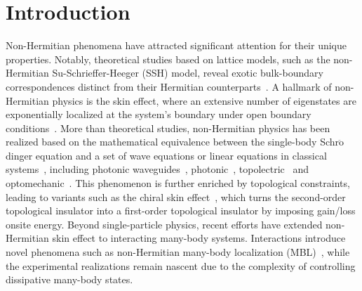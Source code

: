 \documentclass[longbibliography, aps, prx, amsmath, amssymb, amsfonts, twocolumn,superscriptaddress, footinbib]{revtex4-1}
\begin{document}
	\section{Introduction}
	Non-Hermitian phenomena have attracted significant attention for their unique properties. Notably, theoretical studies based on lattice models, such as the non-Hermitian Su-Schrieffer-Heeger (SSH) model, reveal exotic bulk-boundary correspondences distinct from their Hermitian counterparts~\cite{RN1166,RN1168}. 
	A hallmark of non-Hermitian physics is the skin effect, where an extensive number of eigenstates are exponentially localized at the system's boundary under open boundary conditions~\cite{gong2018topological,kawabata2019symmetry,RN1212,RN1214,RN1217,RN1160}. %
	More than theoretical studies, non-Hermitian physics has been realized based on the mathematical equivalence between the single-body Schr$\ddot{\mathrm{o}}$dinger equation and a set of wave equations or linear equations in classical systems~\cite{RN1161}, including photonic waveguides~\cite{nie2023non}, photonic~\cite{RN1165,RN1167,RN1227}, topolectric~\cite{zou2021observation,RN2,RN1225} and optomechanic~\cite{RN632,RN1226}. 
	This phenomenon is further enriched by topological constraints, leading to variants such as the chiral skin effect~\cite{nakamura2023universal, ma2024non,schindler2023hermitian}, which turns the second-order topological insulator into a first-order topological insulator by imposing gain/loss onsite energy. 
	Beyond single-particle physics, recent efforts have extended non-Hermitian skin effect to interacting many-body systems. %
	Interactions introduce novel phenomena such as non-Hermitian many-body localization (MBL)~\cite{mak2024statics,hamazaki2019non}, while the experimental realizations remain nascent due to the complexity of controlling dissipative many-body states.
\end{document}
